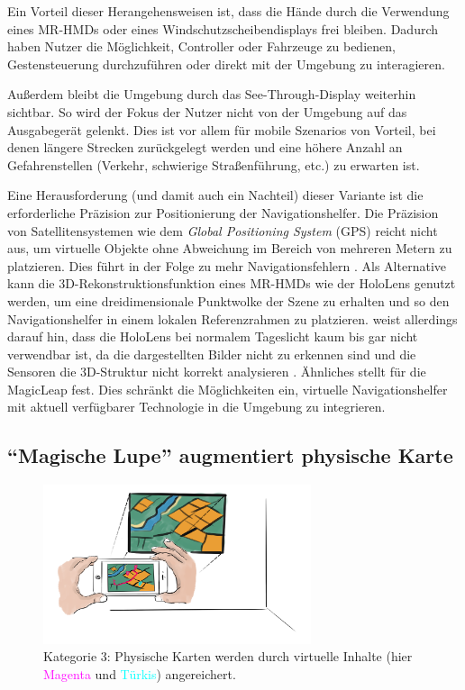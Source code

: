 Ein Vorteil dieser Herangehensweisen ist, dass die Hände durch die Verwendung eines MR-HMDs oder eines Windschutzscheibendisplays frei bleiben.
Dadurch haben Nutzer die Möglichkeit, Controller oder Fahrzeuge zu bedienen, Gestensteuerung durchzuführen oder direkt mit der Umgebung zu interagieren.

Außerdem bleibt die Umgebung durch das See-Through-Display weiterhin sichtbar.
So wird der Fokus der Nutzer nicht von der Umgebung auf das Ausgabegerät gelenkt.
Dies ist vor allem für mobile Szenarios von Vorteil, bei denen längere Strecken zurückgelegt werden und eine höhere Anzahl an Gefahrenstellen (Verkehr, schwierige Straßenführung, etc.) zu erwarten ist.

Eine Herausforderung (und damit auch ein Nachteil) dieser Variante ist die erforderliche Präzision zur Positionierung der Navigationshelfer.
Die Präzision von Satellitensystemen wie dem \emph{Global Positioning System} (GPS) reicht nicht aus, um virtuelle Objekte ohne Abweichung im Bereich von mehreren Metern zu platzieren.
Dies führt in der Folge zu mehr Navigationsfehlern \parencites[378]{Wiesner2017}{Pfannmueller2015}.
Als Alternative kann die 3D-Rekonstruktionsfunktion eines MR-HMDs wie der HoloLens genutzt werden, um eine dreidimensionale Punktwolke der Szene zu erhalten und so den Navigationshelfer in einem lokalen Referenzrahmen zu platzieren.
\citeauthor{Schroeder2017} weist allerdings darauf hin, dass die HoloLens bei normalem Tageslicht kaum bis gar nicht verwendbar ist, da die dargestellten Bilder nicht zu erkennen sind und die Sensoren die 3D-Struktur nicht korrekt analysieren \parencite[47]{Schroeder2017}.
Ähnliches stellt \citeauthor{Strange2018} für die MagicLeap fest.
Dies schränkt die Möglichkeiten ein, virtuelle Navigationshelfer mit aktuell verfügbarer Technologie in die Umgebung zu integrieren.

\subsection{\enquote{Magische Lupe} augmentiert physische Karte}
\begin{figure}[h]
    \centering
    \includegraphics[width=0.7\textwidth]{figures/sketch_ar_physical}
    \caption{Kategorie 3: Physische Karten werden durch virtuelle Inhalte (hier \textcolor{magenta}{Magenta} und \textcolor{cyan}{Türkis}) angereichert.}
    \label{fig:sketch_ar_physical}
\end{figure}

